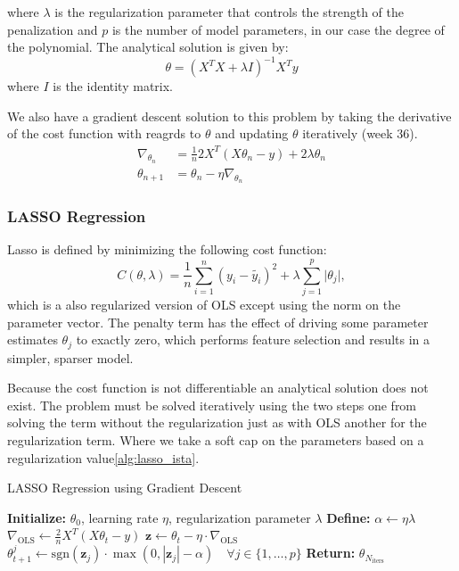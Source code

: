 \documentclass[amssymb,twocolumn,aps]{revtex4}
\begin{document}
where $\lambda$ is the regularization parameter that controls the strength of the penalization and $p$ is the number of model parameters, in our case the degree of the polynomial.
The analytical solution is given by:
\begin{equation}
\theta = (X^TX + \lambda I)^{-1}X^Ty
\end{equation}
where $I$ is the identity matrix.

We also have a gradient descent solution to this problem by taking the derivative of the cost function with reagrds to $\theta$ and updating $\theta$ iteratively \cite{compfys}(week 36).
\begin{align*}
\nabla_{\theta_n} &= \frac{1}{n}2X^T(X\theta_n - y) + 2\lambda \theta_n \\
\theta_{n+1} &= \theta_n - \eta \nabla_{\theta_n}
\end{align*}

\subsubsection{LASSO Regression}
Lasso is defined by minimizing the following cost function:
$$
C(\theta, \lambda)=\frac{1}{n}\sum^n_{i=1}(y_i- \tilde{y_i})^2+\lambda \sum_{j=1}^p\vert \theta_j\vert
,$$
which is a also regularized version of OLS except using the norm on the parameter vector.
The penalty term has the effect of driving some parameter estimates $\theta_j$ to exactly zero, which performs feature selection and results in a simpler, sparser model.

Because the cost function is not differentiable an analytical solution does not exist.
The problem must be solved iteratively using the two steps one from solving the term without the regularization just as with OLS another for the regularization term.
Where we take a soft cap on the parameters based on a regularization value\ref{alg:lasso_ista}.

\begin{algorithm}
\caption{LASSO Regression using Gradient Descent }
\label{alg:lasso_ista}
\begin{algorithmic}[1]
\State \textbf{Initialize:} $\theta_0$, learning rate $\eta$, regularization parameter $\lambda$
\State \textbf{Define:} $\alpha \leftarrow \eta \lambda$
    \State $\nabla_{\text{OLS}} \leftarrow \frac{2}{n}X^T(X\theta_t - y)$
    \State $\mathbf{z} \leftarrow \theta_t - \eta \cdot \nabla_{\text{OLS}}$
    \State $\theta_{t+1}^j \leftarrow \text{sgn}(\mathbf{z}_j) \cdot \max(0, |\mathbf{z}_j| - \alpha) \quad \forall j \in \{1, \dots, p\}$
\EndFor
\State \textbf{Return:} $\theta_{N_{\text{iters}}}$
\end{algorithmic}
\end{algorithm}
\end{document}
